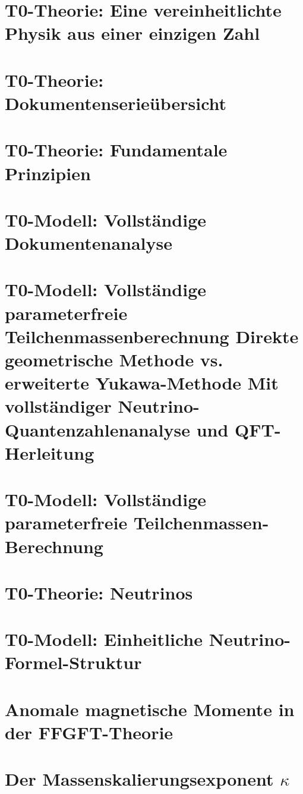 	
	\chapter{T0-Theorie: Eine vereinheitlichte Physik aus einer einzigen Zahl}
	
	\chapter{T0-Theorie: Dokumentenserieübersicht}

	
	\chapter{T0-Theorie: Fundamentale Prinzipien}
	
	\chapter{T0-Modell: Vollständige Dokumentenanalyse}
	
	\chapter{T0-Modell: Vollständige parameterfreie Teilchenmassenberechnung Direkte geometrische Methode vs. erweiterte Yukawa-Methode Mit vollständiger Neutrino-Quantenzahlenanalyse und QFT-Herleitung}
	
	\chapter{T0-Modell: Vollständige parameterfreie Teilchenmassen-Berechnung}
	
	\chapter{T0-Theorie: Neutrinos}
	
	\chapter{T0-Modell: Einheitliche Neutrino-Formel-Struktur}
	
	\chapter{Anomale magnetische Momente in der FFGFT-Theorie}
	
	\chapter{Der Massenskalierungsexponent $\kappa$}
	
